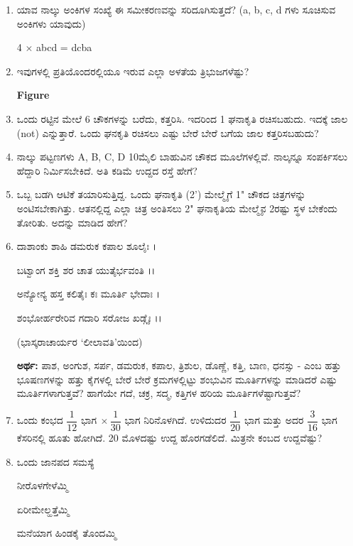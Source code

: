 \begin{enumerate}
\item ಯಾವ ನಾಲ್ಕು ಅಂಕಿಗಳ ಸಂಖ್ಯೆ ಈ ಸಮೀಕರಣವನ್ನು ಸರಿದೂಗಿಸುತ್ತದೆ? (a, b, c, d ಗಳು ಸೂಚಿಸುವ ಅಂಕಿಗಳು ಯಾವುದು)

4 $\times$ abcd = dcba

\item ಇವುಗಳಲ್ಲಿ ಪ್ರತಿಯೊಂದರಲ್ಲಿಯೂ ಇರುವ ಎಲ್ಲಾ ಅಳತೆಯ ತ್ರಿಭುಜಗಳೆಷ್ಟು?

\begin{center}
{\bf Figure}
\end{center}

\item ಒಂದು ರಟ್ಟಿನ ಮೇಲೆ 6 ಚೌಕಗಳನ್ನು ಬರೆದು, ಕತ್ತರಿಸಿ. ಇದರಿಂದ 1 ಘನಾಕೃತಿ ರಚಿಸಬಹುದು. ಇದಕ್ಕೆ ಜಾಲ (not) ಎನ್ನುತ್ತಾರೆ. ಒಂದು ಘನಕೃತಿ ರಚಿಸಲು ಎಷ್ಟು ಬೇರೆ ಬೇರೆ ಬಗೆಯ ಜಾಲ ಕತ್ತರಿಸಬಹುದು?

\item ನಾಲ್ಕು ಪಟ್ಟಣಗಳು A, B, C, D 10ಮೈಲಿ ಬಾಹುವಿನ ಚೌಕದ ಮೂಲೆಗಳಲ್ಲಿವೆ. ನಾಲ್ಕನ್ನೂ ಸಂಪರ್ಕಿಸಲು ಹೆದ್ದಾರಿ ನಿರ್ಮಿಸಬೇಕಿದೆ. ಅತಿ ಕಡಿಮೆ ಉದ್ದದ ರಸ್ತೆ ಹೇಗೆ?

\item ಒಬ್ಬ ಬಡಗಿ ಆಟಿಕೆ ತಯಾರಿಸುತ್ತಿದ್ದ. ಒಂದು ಘನಾಕೃತಿ (2') ಮೇಲ್ಮೈಗೆ 1" ಚೌಕದ ಚಿತ್ರಗಳನ್ನು ಅಂಟಿಸಬೇಕಾಗಿತ್ತು. ಆತನಲ್ಲಿದ್ದ ಎಲ್ಲಾ ಚಿತ್ರ ಅಂತಿಸಲು 2" ಘನಾಕೃತಿಯ ಮೇಲ್ಮೈನ 2ರಷ್ಟು ಸ್ಥಳ ಬೇಕೆಂದು ತೋರಿತು. ಅದನ್ನು ಮಾಡಿದ ಹೇಗೆ?

\item ದಾಶಾಂಕು ಶಾಹಿ ಡಮರುಕ ಕಪಾಲ ಶೂಲೈಃ ।

ಬಟ್ವಾಂಗ ಶಕ್ತಿ ಶರ ಚಾತ ಯುತೈರ್ಭವಂತಿ ।।

ಅನ್ಯೋನ್ಯ ಹಸ್ತ ಕಲಿತೈಃ ಕಃ ಮೂರ್ತಿ ಭೇದಾಃ ।

ಶಂಭೋರ್ಹರೇರಿವ ಗದಾರಿ ಸರೋಜ ಖಡ್ಗೈಃ ।।

\hfill (ಭಾಸ್ಕರಾಚಾರ್ಯರ ‘ಲೀಲಾವತಿ’ಯಿಂದ)

{\bf ಅರ್ಥ:} ಪಾಶ, ಅಂಗುಶ, ಸರ್ಪ, ಡಮರುಕ, ಕಪಾಲ, ತ್ರಿಶುಲ, ಡೊಣ್ಣೆ, ಕತ್ತಿ, ಬಾಣ, ಧನಸ್ಸು - ಎಂಬ ಹತ್ತು ಭೂಷಣಗಳನ್ನು ಹತ್ತು ಕೈಗಳಲ್ಲಿ ಬೇರೆ ಬೇರೆ ಕ್ರಮಗಳಲ್ಲಿಟ್ಟು ಶಂಭುವಿನ ಮೂರ್ತಿಗಳನ್ನು ಮಾಡಿದರೆ ಎಷ್ಟು ಮೂರ್ತಿಗಳಾಗುತ್ತವೆ? ಹಾಗೆಯೇ ಗದೆ, ಚಕ್ರ, ಸದ್ಮ, ಕತ್ತಿಗಳ ಹರಿಯ ಮೂರ್ತಿಗಳೆಷ್ಟಾಗುತ್ತವೆ?

\item ಒಂದು ಕಂಭದ $\dfrac{1}{12} \text{ ಭಾಗ}~ \times \dfrac{1}{30}$ ಭಾಗ ನಿರಿನೊಳಗಿದೆ. ಉಳಿದುದರ $\dfrac{1}{20}$ ಭಾಗ ಮತ್ತು ಅದರ $\dfrac{3}{16}$ ಭಾಗ ಕೆಸರಿನಲ್ಲಿ ಹೂತು ಹೋಗಿದೆ. 20 ಮೊಳದಷ್ಟು ಉದ್ದ ಹೊರಗಡೆಲಿದೆ. ಮಿತ್ರನೇ ಕಂಬದ ಉದ್ದವೆಷ್ಟು?

\item ಒಂದು ಜಾನಪದ ಸಮಸ್ಯೆ 

ನೀರೊಳಗೇಳೆಮ್ಮಿ 

ಏರೀಮೇಲ್ಹತ್ತೆಮ್ಮಿ 

ಮನೆಯಾಗ ಹಿಂಡಕೈ ತೊಂದಮ್ಮಿ 


\end{enumerate}
